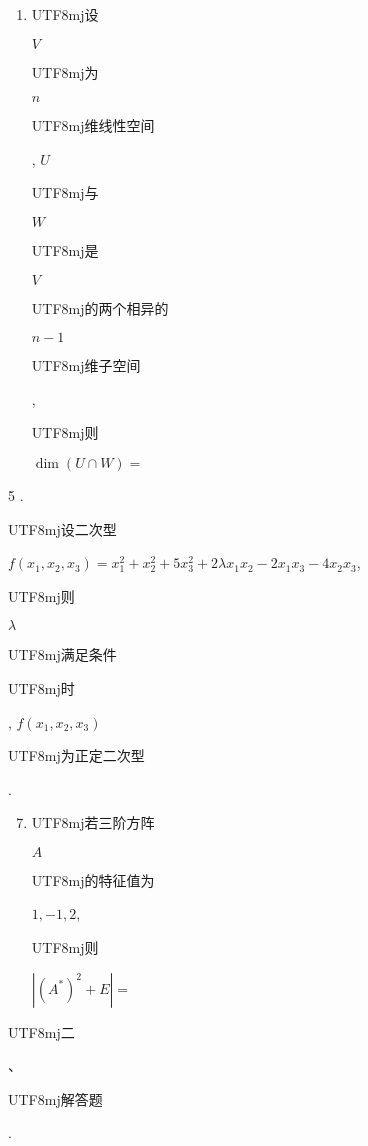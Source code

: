 \documentclass[10pt]{article}
\begin{document}
\begin{enumerate}
  \item \begin{CJK}{UTF8}{mj}设\end{CJK} $V$ \begin{CJK}{UTF8}{mj}为\end{CJK} $n$ \begin{CJK}{UTF8}{mj}维线性空间\end{CJK}, $U$ \begin{CJK}{UTF8}{mj}与\end{CJK} $W$ \begin{CJK}{UTF8}{mj}是\end{CJK} $V$ \begin{CJK}{UTF8}{mj}的两个相异的\end{CJK} $n-1$ \begin{CJK}{UTF8}{mj}维子空间\end{CJK}, \begin{CJK}{UTF8}{mj}则\end{CJK} $\operatorname{dim}(U \cap W)=$

\end{enumerate}
5 . \begin{CJK}{UTF8}{mj}设二次型\end{CJK} $f\left(x_{1}, x_{2}, x_{3}\right)=x_{1}^{2}+x_{2}^{2}+5 x_{3}^{2}+2 \lambda x_{1} x_{2}-2 x_{1} x_{3}-4 x_{2} x_{3}$, \begin{CJK}{UTF8}{mj}则\end{CJK} $\lambda$ \begin{CJK}{UTF8}{mj}满足条件\end{CJK} \begin{CJK}{UTF8}{mj}时\end{CJK}, $f\left(x_{1}, x_{2}, x_{3}\right)$ \begin{CJK}{UTF8}{mj}为正定二次型\end{CJK}.

\begin{enumerate}
  \setcounter{enumi}{6}
  \item \begin{CJK}{UTF8}{mj}若三阶方阵\end{CJK} $A$ \begin{CJK}{UTF8}{mj}的特征值为\end{CJK} $1,-1,2$, \begin{CJK}{UTF8}{mj}则\end{CJK} $\left|\left(A^{*}\right)^{2}+E\right|=$
\end{enumerate}
\begin{CJK}{UTF8}{mj}二\end{CJK}、\begin{CJK}{UTF8}{mj}解答题\end{CJK}.
\end{document}
